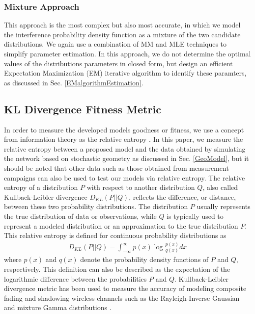 \documentclass[12pt, draftclsnofoot, onecolumn]{IEEEtran}
\theoremstyle{plain}
\begin{document}
\subsubsection{Mixture Approach}
This approach is the most complex but also most accurate, in which we model the interference probability density function as a mixture of the two candidate distributions. We again use a combination of MM and MLE techniques to simplify parameter estimation. In this approach, we do not determine the optimal values of the distributions parameters in closed form, but design an efficient {Expectation Maximization (EM)} iterative algorithm to identify these paramters, as discussed in Sec. \ref{EMalgorithmEstimation}.
%
\vspace{-.1in}
\subsection{KL Divergence Fitness Metric}%
In order to measure the {developed} models goodness or fitness, we use a concept from information theory as the relative entropy {\cite{CoverRelativeEntropy}}. {\color{black}In this paper, we measure the relative entropy between a proposed model and the data  obtained by simulating the network based on stochastic geometry as discussed in Sec. \ref{GeoModel}, but it should be noted that other data such as those obtained from measurement campaigns can also be used to test our models via relative entropy.} The relative entropy of a distribution $P$ with respect to another distribution $Q$, also called Kullback-Leibler divergence $D_{KL}(P || Q)$, reflects the difference, or distance, between these two probability distributions. The distribution $P$ usually represents the true distribution of data or observations, while $Q$ is typically used to represent a modeled distribution or an approximation to the true distribution $P$. This relative entropy is defined for continuous probability distributions as
\begin{eqnarray}
D_{KL}(P || Q)= \int_{-\infty}^{\infty} p(x) \log \frac{p(x)}{q(x)} dx
\end{eqnarray}
where $p(x)$ and $q(x)$ denote the probability density functions of $P$ and $Q$, respectively. This definition can also be described as the expectation of the logarithmic difference between the probabilities $P$ and $Q$. 
{Kullback-Leibler divergence metric has been used to measure the accuracy of modeling composite fading and shadowing wireless channels such as the Rayleigh-Inverse Gaussian and mixture Gamma distributions \cite{KL_IG_agrawal2007efficacy,KL_6059452}.}
%
\vspace{-.1in}
\end{document}
